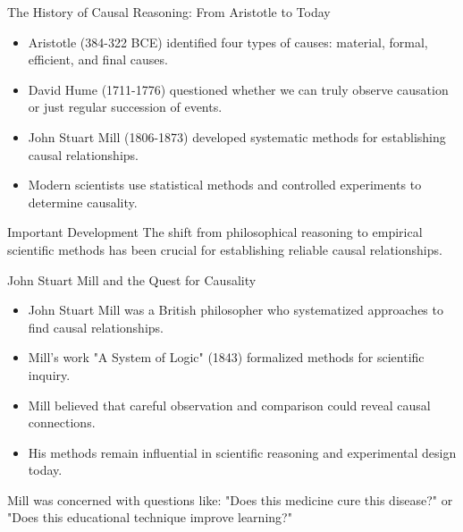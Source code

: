 \documentclass{beamer}
\begin{document}
\begin{frame}{The History of Causal Reasoning: From Aristotle to Today}
    \begin{itemize}
        \item Aristotle (384-322 BCE) identified four types of causes: material, formal, efficient, and final causes.
        \item David Hume (1711-1776) questioned whether we can truly observe causation or just regular succession of events.
        \item John Stuart Mill (1806-1873) developed systematic methods for establishing causal relationships.
        \item Modern scientists use statistical methods and controlled experiments to determine causality.
    \end{itemize}
    
    \begin{alertblock}{Important Development}
        The shift from philosophical reasoning to empirical scientific methods has been crucial for establishing reliable causal relationships.
    \end{alertblock}
\end{frame}

\begin{frame}{John Stuart Mill and the Quest for Causality}
    \begin{itemize}
        \item John Stuart Mill was a British philosopher who systematized approaches to find causal relationships.
        \item Mill's work "A System of Logic" (1843) formalized methods for scientific inquiry.
        \item Mill believed that careful observation and comparison could reveal causal connections.
        \item His methods remain influential in scientific reasoning and experimental design today.
    \end{itemize}
    
    \begin{example}
        Mill was concerned with questions like: "Does this medicine cure this disease?" or "Does this educational technique improve learning?"
    \end{example}
\end{frame}
\end{document}
